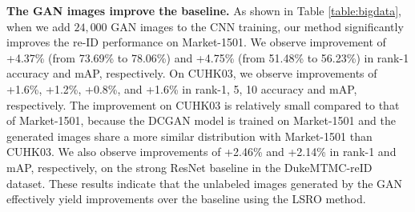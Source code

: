 \documentclass[10pt,twocolumn,letterpaper]{article}
\begin{document}
\textbf{The GAN images improve the baseline.}
As shown in Table \ref{table:bigdata}, when we add $24,000$ GAN images to the CNN training, our method significantly improves the re-ID performance on Market-1501. We observe improvement of +4.37\% (from 73.69\% to 78.06\%) and +4.75\% (from 51.48\% to 56.23\%) in rank-1 accuracy and mAP, respectively. On CUHK03, we observe improvements of +1.6\%, +1.2\%, +0.8\%, and +1.6\% in rank-1, 5, 10 accuracy and mAP, respectively. The improvement on CUHK03 is relatively small compared to that of Market-1501, because the DCGAN model is trained on Market-1501 and the generated images share a more similar distribution with Market-1501 than CUHK03. We also observe improvements of +2.46\% and +2.14\% in rank-1 and mAP, respectively, on the strong ResNet baseline in the DukeMTMC-reID dataset. These results indicate that the unlabeled images generated by the GAN effectively yield improvements over the baseline using the LSRO method. 
\setlength{\tabcolsep}{5.7pt}
\end{document}
